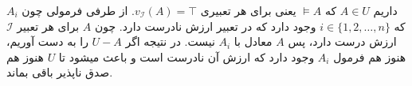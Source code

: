\documentclass[]{exam}
\begin{document}
    داریم
    $A \in U$
    که
    $\models A$
    یعنی برای هر تعبیری
    $v_\mathscr{I} (A) = \top$.
    از طرفی فرمولی چون
    $A_i$
    که 
    $i \in \{1, 2, \dots, n\}$
    وجود دارد که در تعبیر
    ارزش نادرست دارد.
    چون
    $A$
    برای هر تعبیر 
    $\mathscr{I}$
    ارزش درست دارد، پس
    $A$
    معادل با
    $A_i$
    نیست.
    در نتیجه اگر 
    $U - A$
    را به دست آوریم، هنوز هم فرمول 
    $A_i$
    وجود دارد که ارزش آن نادرست است و باعث میشود تا 
    $U$
    هنوز هم صدق ناپذیر باقی بماند.
    
\end{document}
